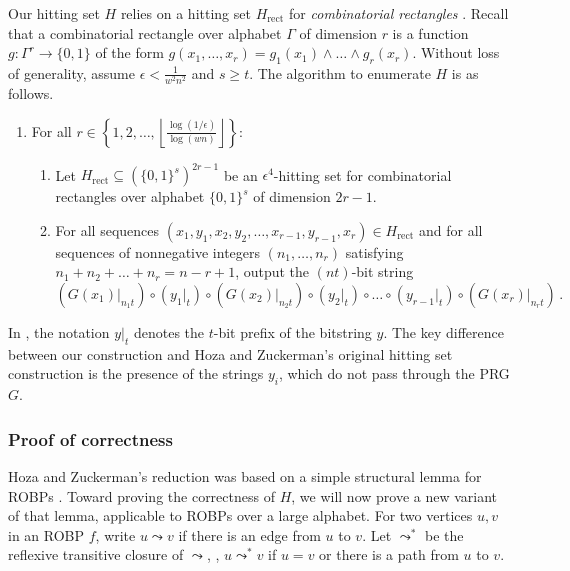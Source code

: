 Our hitting set $H$ relies on a hitting set $H_{\text{rect}}$ for \emph{combinatorial rectangles} \cite{LLSZ97}. Recall that a combinatorial rectangle over alphabet $\Gamma$ of dimension $r$ is a function $g \colon \Gamma^r \to \{0, 1\}$ of the form $g(x_1, \dots, x_r) = g_1(x_1) \wedge \dots \wedge g_r(x_r)$. Without loss of generality, assume $\epsilon < \frac{1}{w^2 n^2}$ and $s \geq t$. The algorithm to enumerate $H$ is as follows.
\begin{enumerate}
\item For all $r \in \left\{1, 2, \dots, \left\lfloor \frac{\log(1/\epsilon)}{\log(wn)} \right\rfloor\right\}$:
\begin{enumerate}
\item Let $H_{\text{rect}} \subseteq (\{0, 1\}^s)^{2r - 1}$ be an $\epsilon^4$-hitting set for combinatorial rectangles over alphabet $\{0, 1\}^s$ of dimension $2r - 1$.
\item For all sequences $(x_1, y_1, x_2, y_2, \dots, x_{r - 1}, y_{r - 1}, x_r) \in H_{\text{rect}}$ and for all sequences of nonnegative integers $(n_1, \dots, n_r)$ satisfying $n_1 + n_2 + \dots + n_r = n - r + 1$, output the $(nt)$-bit string
\begin{equation} \label{eqn:large-alphabet-hz}
(G(x_1)|_{n_1 t}) \circ (y_1|_t) \circ (G(x_2)|_{n_2 t}) \circ (y_2|_t) \circ \dots \circ (y_{r - 1}|_t) \circ (G(x_r)|_{n_r t})\,.
\end{equation}
\end{enumerate}
\end{enumerate}
In , the notation $y|_t$ denotes the $t$-bit prefix of the bitstring $y$. The key difference between our construction and Hoza and Zuckerman's original hitting set construction \cite{HZ20} is the presence of the strings $y_i$, which do not pass through the PRG $G$.

\subsubsection{Proof of correctness}

Hoza and Zuckerman's reduction was based on a simple structural lemma for ROBPs \cite[Lemma 1]{HZ20}. Toward proving the correctness of $H$, we will now prove a new variant of that lemma, applicable to ROBPs over a large alphabet. For two vertices $u, v$ in an ROBP $f$, write $u \leadsto v$ if there is an edge from $u$ to $v$. Let $\leadsto^*$ be the reflexive transitive closure of $\leadsto$, \ie, $u \leadsto^* v$ if $u = v$ or there is a path from $u$ to $v$.


